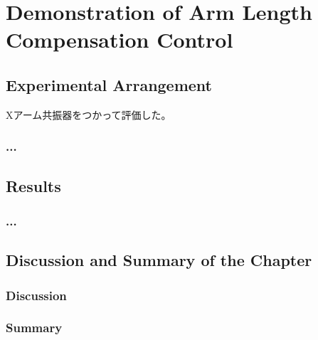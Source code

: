 \chapter{Demonstration of Arm Length Compensation Control}
\section{Experimental Arrangement}
Xアーム共振器をつかって評価した。
\subsection{...}
\section{Results}
\subsection{...}
\section{Discussion and Summary of the Chapter}
\subsection{Discussion}
\subsection{Summary}
